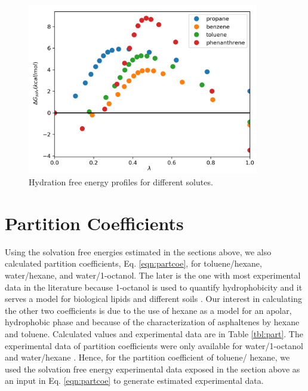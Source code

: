 \begin{figure}[H]
\centering
\includegraphics[width=0.9\textwidth]{Figures/water}
\caption{Hydration free energy profiles for different solutes.}
\label{fig:water}
\end{figure}

\section{Partition Coefficients}

Using the solvation free energies estimated in the sections above, we also calculated partition coefficients, Eq. \eqref{eqn:partcoe}, for toluene/hexane, water/hexane, and water/1-octanol. The later is the one with most experimental data in the literature because 1-octanol is used to quantify hydrophobicity and it serves a model for biological lipids and different soils \cite{RUELLE2000457}. Our interest in calculating the other two coefficients is due to the use of hexane as a model for an apolar, hydrophobic phase and because of the characterization of asphaltenes by hexane and toluene. Calculated values and experimental data are in Table \ref{tbl:part}. The experimental data of partition coefficients  were only available for water/1-octanol  \cite{POOLE2000117,sangster} and water/hexane \cite{doi:10.1021/je970112e}. Hence, for the partition coefficient of toluene/ hexane, we used the solvation free energy experimental data exposed in the section above as an input in Eq. \eqref{eqn:partcoe} to generate estimated experimental data.


